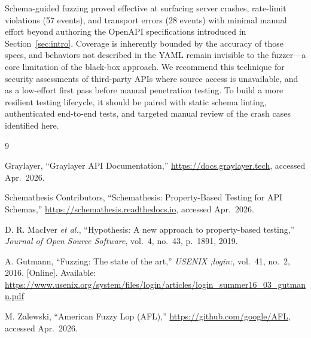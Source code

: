 \documentclass[12pt]{article}
\begin{document}
Schema-guided fuzzing proved effective at surfacing server crashes, rate-limit
violations (57 events), and transport errors (28 events) with minimal manual effort
beyond authoring the OpenAPI specifications introduced in Section~\ref{sec:intro}.
Coverage is inherently bounded by the accuracy of those specs, and behaviors not
described in the YAML remain invisible to the fuzzer---a core limitation of the
black-box approach. We recommend this technique for security assessments of
third-party APIs where source access is unavailable, and as a low-effort first pass
before manual penetration testing. To build a more resilient testing lifecycle, it should
be paired with static schema linting, authenticated end-to-end tests, and targeted
manual review of the crash cases identified here.



\begin{thebibliography}{9}

Graylayer, ``Graylayer API Documentation,''
\url{https://docs.graylayer.tech}, accessed Apr.\ 2026.

Schemathesis Contributors, ``Schemathesis: Property-Based Testing for API Schemas,''
\url{https://schemathesis.readthedocs.io}, accessed Apr.\ 2026.

D. R. MacIver \textit{et al.}, ``Hypothesis: A new approach to property-based testing,''
\textit{Journal of Open Source Software}, vol.\ 4, no.\ 43, p.\ 1891, 2019.

A. Gutmann, ``Fuzzing: The state of the art,''
\textit{USENIX ;login:}, vol.\ 41, no.\ 2, 2016.
[Online]. Available: \url{https://www.usenix.org/system/files/login/articles/login_summer16_03_gutmann.pdf}

M. Zalewski, ``American Fuzzy Lop (AFL),''
\url{https://github.com/google/AFL}, accessed Apr.\ 2026.

\end{thebibliography}
\end{document}
